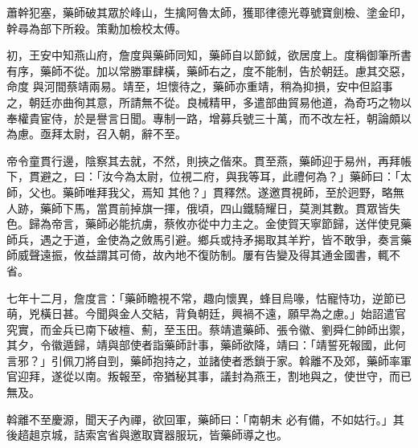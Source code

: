\begin{pinyinscope}
 蕭幹犯塞，藥師破其眾於峰山，生擒阿魯太師，獲耶律德光尊號寶劍檢、塗金印，幹尋為部下所殺。策勳加檢校太傅。



 初，王安中知燕山府，詹度與藥師同知，藥師自以節鉞，欲居度上。度稱御筆所書有序，藥師不從。加以常勝軍肆橫，藥師右之，度不能制，告於朝廷。慮其交惡，命度
 與河間蔡靖兩易。靖至，坦懷待之，藥師亦重靖，稍為抑損，安中但諂事之，朝廷亦曲徇其意，所請無不從。良械精甲，多遣部曲貿易他道，為奇巧之物以奉權貴宦侍，於是譽言日聞。專制一路，增募兵號三十萬，而不改左衽，朝論頗以為慮。亟拜太尉，召入朝，辭不至。



 帝令童貫行邊，陰察其去就，不然，則挾之偕來。貫至燕，藥師迎于易州，再拜帳下，貫避之，曰：「汝今為太尉，位視二府，與我等耳，此禮何為？」藥師曰：「太師，父也。藥師唯拜我父，焉知
 其他？」貫釋然。遂邀貫視師，至於迥野，略無人跡，藥師下馬，當貫前掉旗一揮，俄頃，四山鐵騎耀日，莫測其數。貫眾皆失色。歸為帝言，藥師必能抗虜，蔡攸亦從中力主之。金使賀天寧節歸，送伴使見藥師兵，遇之于道，金使為之斂馬引避。鄉兵或持矛揭取其羊羜，皆不敢爭，奏言藥師威聲遠振，攸益謂其可倚，故內地不復防制。屢有告變及得其通金國書，輒不省。



 七年十二月，詹度言：「藥師瞻視不常，趣向懷異，蜂目烏喙，怙寵恃功，逆節已
 萌，兇橫日甚。今聞與金人交結，背負朝廷，興禍不遠，願早為之慮。」始詔遣官究實，而金兵已南下破檀、薊，至玉田。蔡靖遣藥師、張令徽、劉舜仁帥師出禦，其夕，令徽遁歸，靖與部使者詣藥師計事，藥師欲降，靖曰：「靖誓死報國，此何言邪？」引佩刀將自剄，藥師抱持之，並諸使者悉鎖于家。斡離不及郊，藥師率軍官迎拜，遂從以南。叛報至，帝猶秘其事，議封為燕王，割地與之，使世守，而已無及。



 斡離不至慶源，聞天子內禪，欲回軍，藥師曰：「南朝未
 必有備，不如姑行。」其後趦趄京城，詰索宮省與邀取寶器服玩，皆藥師導之也。



\end{pinyinscope}
